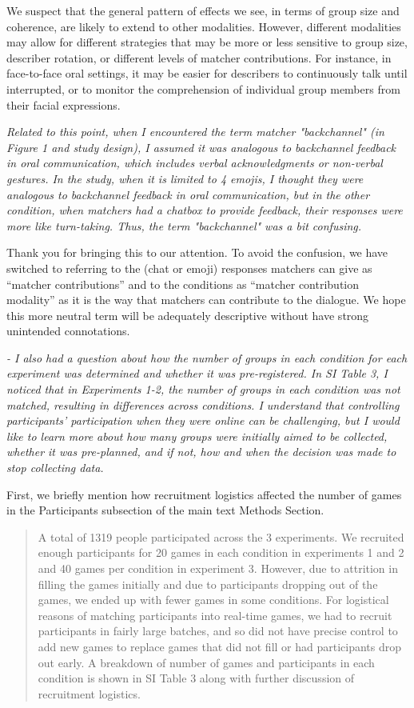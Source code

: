 \documentclass{stanfordletter}
\newcommand{\theysaid}[1]{\begin{leftbar} \noindent 
		\textsl{ #1}\end{leftbar}}
\newcommand{\revised}[1]{\begin{quote}	#1 \end{quote}}
\begin{document}
\begin{letter}{}
{          	We suspect that the general pattern of effects we see, in terms of group size and coherence, are likely to extend to other modalities. However, different modalities may allow for different strategies that may be more or less sensitive to group size, describer rotation, or different levels of matcher contributions. For instance, in face-to-face oral settings, it may be easier for describers to continuously talk until interrupted, or to monitor the comprehension of individual group members from their facial expressions.}
          
          \theysaid{Related to this point, when I encountered the term matcher "backchannel" (in Figure 1 and study design), I assumed it was analogous to backchannel feedback in oral communication, which includes verbal acknowledgments or non-verbal gestures. In the study, when it is limited to 4 emojis, I thought they were analogous to backchannel feedback in oral communication, but in the other condition, when matchers had a chatbox to provide feedback, their responses were more like turn-taking. Thus, the term "backchannel" was a bit confusing.}
          
          Thank you for bringing this to our attention. To avoid the confusion, we have switched to referring to the (chat or emoji) responses matchers can give as ``matcher contributions'' and to the conditions as ``matcher contribution modality'' as it is the way that matchers can contribute to the dialogue.  We hope this more neutral term will be adequately descriptive without have strong unintended connotations. 
          
          \theysaid{- I also had a question about how the number of groups in each condition for each experiment was determined and whether it was pre-registered. In SI Table 3, I noticed that in Experiments 1-2, the number of groups in each condition was not matched, resulting in differences across conditions. I understand that controlling participants' participation when they were online can be challenging, but I would like to learn more about how many groups were initially aimed to be collected, whether it was pre-planned, and if not, how and when the decision was made to stop collecting data.}
          
          First, we briefly mention how recruitment logistics affected the number of games in the Participants subsection of the main text Methods Section. 
          
          \revised{A total of 1319 people participated across the 3 experiments. We recruited enough participants for 20 games in each condition in experiments 1 and 2 and 40 games per condition in experiment 3. However, due to attrition in filling the games initially and due to participants dropping out of the games, we ended up with fewer games in some conditions. For logistical reasons of matching participants into real-time games, we had to recruit participants in fairly large batches, and so did not have precise control to add new games to replace games that did not fill or had participants drop out early. A breakdown of number of games and participants in each condition is shown in SI Table 3 along with further discussion of recruitment logistics.}
          

\end{letter}
\end{document}
